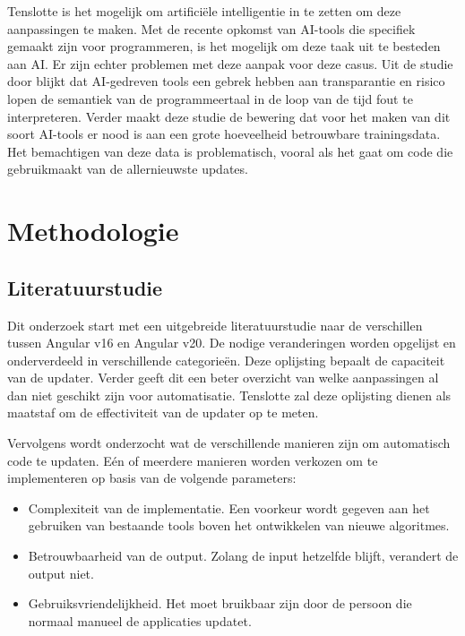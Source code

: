 Tenslotte is het mogelijk om artificiële intelligentie in te zetten om deze aanpassingen te maken.
Met de recente opkomst van AI-tools die specifiek gemaakt zijn voor programmeren, is het mogelijk om deze taak uit te besteden aan AI.
Er zijn echter problemen met deze aanpak voor deze casus.
Uit de studie door \textcite{Hodovychenko2025} blijkt dat AI-gedreven tools een gebrek hebben aan transparantie en risico lopen de semantiek van de programmeertaal in de loop van de tijd fout te interpreteren.
Verder maakt deze studie de bewering dat voor het maken van dit soort AI-tools er nood is aan een grote hoeveelheid betrouwbare trainingsdata.
Het bemachtigen van deze data is problematisch, vooral als het gaat om code die gebruikmaakt van de allernieuwste updates.

\section{Methodologie}
\label{sec:methodologie}

\subsection{Literatuurstudie}
\label{sec:methodologie:literatuurstudie}

Dit onderzoek start met een uitgebreide literatuurstudie naar de verschillen tussen Angular v16 en Angular v20.
De nodige veranderingen worden opgelijst en onderverdeeld in verschillende categorieën.
Deze oplijsting bepaalt de capaciteit van de updater.
Verder geeft dit een beter overzicht van welke aanpassingen al dan niet geschikt zijn voor automatisatie.
Tenslotte zal deze oplijsting dienen als maatstaf om de effectiviteit van de updater op te meten.

Vervolgens wordt onderzocht wat de verschillende manieren zijn om automatisch code te updaten.
Eén of meerdere manieren worden verkozen om te implementeren op basis van de volgende parameters:
\begin{itemize}
  \item Complexiteit van de implementatie. Een voorkeur wordt gegeven aan het gebruiken van bestaande tools boven het ontwikkelen van nieuwe algoritmes.
  \item Betrouwbaarheid van de output. Zolang de input hetzelfde blijft, verandert de output niet.
  \item Gebruiksvriendelijkheid. Het moet bruikbaar zijn door de persoon die normaal manueel de applicaties updatet.
\end{itemize}

